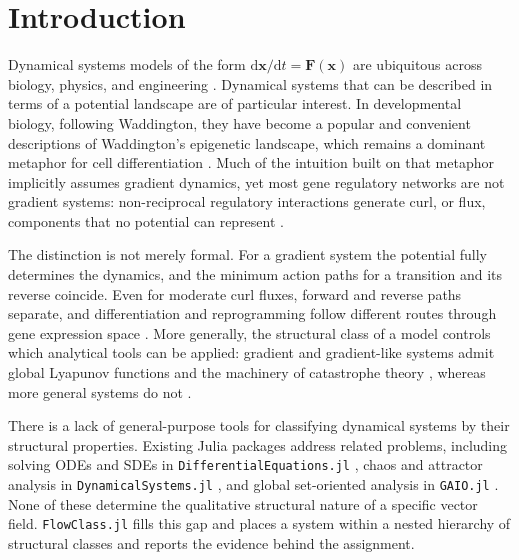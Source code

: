 \documentclass[unnumsec,webpdf,contemporary,large,namedate]{oup-authoring-template}
\begin{document}

\maketitle

\section{Introduction}

Dynamical systems models of the form $\mathrm{d}\bm{x}/\mathrm{d}t =
\bm{F}(\bm{x})$ are ubiquitous across biology, physics, and engineering
\citep{Strogatz2015}. Dynamical systems that can be described in terms of a potential landscape are of particular interest.  
In developmental biology, following Waddington, they have become a popular and convenient descriptions of  Waddington's epigenetic landscape, which remains a dominant metaphor for cell differentiation
\citep{Waddington1957, Huang2007, Moris2016}. Much of the intuition built on
that metaphor implicitly assumes gradient dynamics, yet most gene regulatory
networks are not gradient systems: non-reciprocal regulatory interactions
generate curl, or flux, components that no potential can represent
\citep{Brackston2018, Wang2015}.

The distinction is not merely formal. For a gradient system the potential fully
determines the dynamics, and the minimum action paths for a transition and its
reverse coincide. Even for moderate curl fluxes, forward and reverse
paths separate, and differentiation and reprogramming follow
different routes through gene expression space \citep{Brackston2018,
Guillemin2021}. More generally, the structural class of a model  controls which
analytical tools can be applied: gradient and gradient-like systems admit global Lyapunov
functions and the machinery of catastrophe theory \citep{Rand2021}, whereas more
general systems do not \citep{Smale1967, PalisDeMelo1982}.

There is a lack of general-purpose tools  for classifying dynamical systems by their structural properties.
Existing Julia packages address related  problems, including solving ODEs and SDEs
in \texttt{DifferentialEquations.jl} \citep{Rackauckas2017}, chaos and
attractor analysis in \texttt{DynamicalSystems.jl} \citep{Datseris2018}, and
global set-oriented analysis in \texttt{GAIO.jl} \citep{GAIO2025}. None of these 
determine the qualitative structural nature of a specific vector field. \texttt{FlowClass.jl} fills this gap and places a system within a nested hierarchy of structural classes and reports the evidence behind the assignment.
\end{document}

